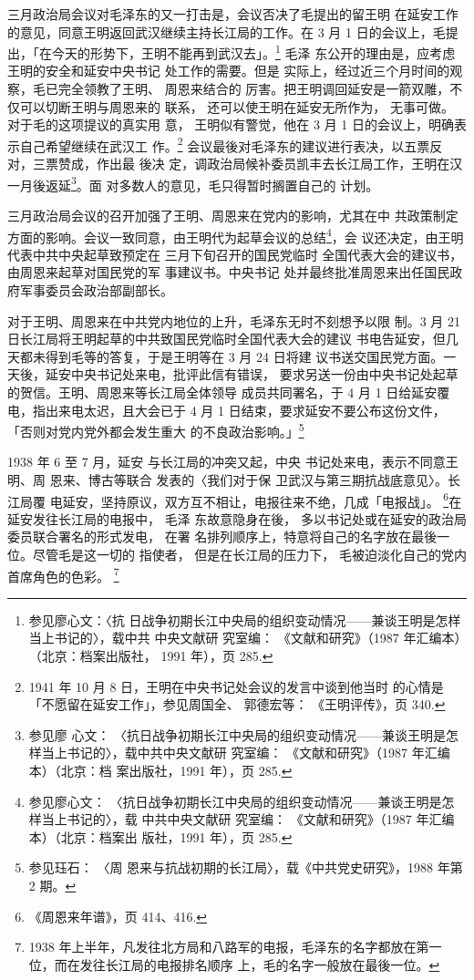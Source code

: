 三月政治局会议对毛泽东的又一打击是，会议否决了毛提出的留王明 在延安工作
的意见，同意王明返回武汉继续主持长江局的工作。在 3 月 1 日的会议上，毛提
出，「在今天的形势下，王明不能再到武汉去」。\footnote{参见廖心文：〈抗
日战争初期长江中央局的组织变动情况——兼谈王明是怎样当上书记的〉，载中共
中央文献研 究室编： 《文献和研究》（1987 年汇编本）（北京：档案出版社，
1991 年），页 285.} 毛泽 东公开的理由是，应考虑王明的安全和延安中央书记
处工作的需要。但是 实际上，经过近三个月时间的观察，毛已完全领教了王明、
周恩来结合的 厉害。把王明调回延安是一箭双雕，不仅可以切断王明与周恩来的
联系， 还可以使王明在延安无所作为， 无事可做。 对于毛的这项提议的真实用
意， 王明似有警觉，他在 3 月 1 日的会议上，明确表示自己希望继续在武汉工
作。\footnote{1941 年 10 月 8 日，王明在中央书记处会议的发言中谈到他当时
的心情是「不愿留在延安工作」，参见周国全、 郭德宏等： 《王明评传》，页
340.} 会议最後对毛泽东的建议进行表决，以五票反对，三票赞成，作出最 後决
定，调政治局候补委员凯丰去长江局工作，王明在汉一月後返延\footnote{参见廖
心文：
〈抗日战争初期长江中央局的组织变动情况——兼谈王明是怎样当上书记的〉，载中共中央文献研 究室编：
《文献和研究》（1987 年汇编本）（北京：档
案出版社，1991 年），页 285.}。面 对多数人的意见，毛只得暂时搁置自己的
计划。

三月政治局会议的召开加强了王明、周恩来在党内的影响，尤其在中 共政策制定
方面的影响。会议一致同意，由王明代为起草会议的总结\footnote{参见廖心文：
〈抗日战争初期长江中央局的组织变动情况——兼谈王明是怎样当上书记的〉，载
中共中央文献研 究室编： 《文献和研究》（1987 年汇编本）（北京：档案出
版社，1991 年），页 285.}，会 议还决定，由王明代表中共中央起草致预定在
三月下旬召开的国民党临时 全国代表大会的建议书，由周恩来起草对国民党的军
事建议书。中央书记 处并最终批准周恩来出任国民政府军事委员会政治部副部长。

对于王明、周恩来在中共党内地位的上升，毛泽东无时不刻想予以限 制。3 月 21
日长江局将王明起草的中共致国民党临时全国代表大会的建议 书电告延安，但几
天都未得到毛等的答复，于是王明等在 3 月 24 日将建 议书送交国民党方面。一
天後，延安中央书记处来电，批评此信有错误， 要求另送一份由中央书记处起草
的贺信。王明、周恩来等长江局全体领导 成员共同署名，于 4 月 1 日给延安覆
电，指出来电太迟，且大会已于 4 月 1 日结束，要求延安不要公布这份文件，
「否则对党内党外都会发生重大 的不良政治影响。」\footnote{参见珏石： 〈周
恩来与抗战初期的长江局〉，载《中共党史研究》，1988 年第 2 期。}

1938 年
6 至 7 月，延安 与长江局的冲突又起，中央 书记处来电，表示不同意王明、周
恩来、博古等联合 发表的〈我们对于保 卫武汉与第三期抗战底意见〉。长江局覆
电延安，坚持原议，双方互不相让，电报往来不绝，几成「电报战」。
\footnote{《周恩来年谱》，页 414、416.}在延安发往长江局的电报中， 毛泽
东故意隐身在後， 多以书记处或在延安的政治局委员联合署名的形式发电， 在署
名排列顺序上，特意将自己的名字放在最後一位。尽管毛是这一切的
指使者，
但是在长江局的压力下，
毛被迫淡化自己的党内首席角色的色彩。
\footnote{ 1938 年上半年，凡发往北方局和八路军的电报，毛泽东的名字都放在第一位，而在发往长江局的电报排名顺序
上，毛的名字一般放在最後一位。}
 
